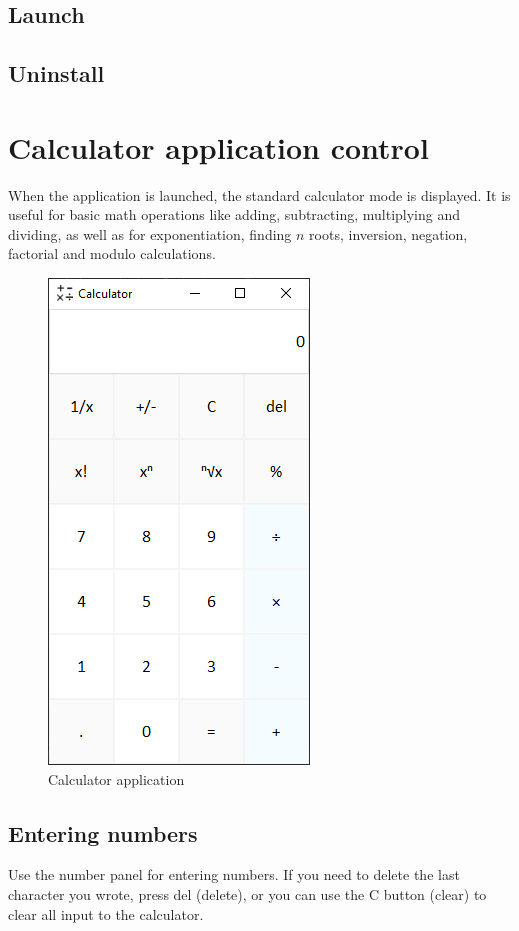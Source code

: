 \documentclass[12pt]{article}
\begin{document}
\subsection{Launch}
\subsection{Uninstall}
\newpage

\section{Calculator application control}
When the application is launched, the standard calculator mode is displayed. It is useful for basic math operations like adding, subtracting, multiplying and dividing, as well as for exponentiation, finding $n$ roots, inversion, negation, factorial and modulo calculations.

\begin{figure}[H]
\centering
  \includegraphics[scale=1]{calculator_GUI_screenshot.PNG}
  \caption{Calculator application}
  \label{fig:calculator}
\end{figure}

\subsection{Entering numbers}
Use the number panel for entering numbers.
If you need to delete the last character you wrote, press del (delete), or you can use the C button (clear) to clear all input to the calculator.\par
\end{document}
